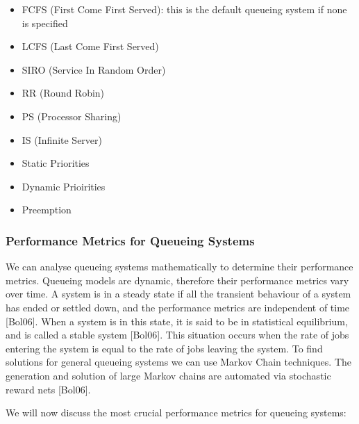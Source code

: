 \documentclass[a4paper,11pt,titlepage]{article}
\begin{document}
\begin{itemize}
    \item FCFS (First Come First Served): this is the default queueing system if none is specified
    \item LCFS (Last Come First Served)
    \item SIRO (Service In Random Order)
    \item RR (Round Robin)
    \item PS (Processor Sharing)
    \item IS (Infinite Server)
    \item Static Priorities 
    \item Dynamic Prioirities 
    \item Preemption
\end{itemize}

\subsubsection{Performance Metrics for Queueing Systems}

We can analyse queueing systems mathematically to determine their performance metrics. Queueing models are dynamic, therefore their performance metrics vary over time. A system is in a steady state if all the transient behaviour of a system has ended or settled down, and the performance metrics are independent of time [Bol06]. When a system is in this state, it is said to be in statistical equilibrium, and is called a stable system [Bol06]. This situation occurs when the rate of jobs entering the system is equal to the rate of jobs leaving the system. To find solutions for general queueing systems we can use Markov Chain techniques. The generation and solution of large Markov chains are automated via stochastic reward nets [Bol06].

We will now discuss the most crucial performance metrics for queueing systems: 
\end{document}
